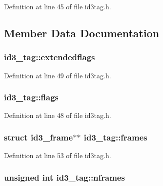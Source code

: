 Definition at line 45 of file id3tag.\+h.



\subsection{Member Data Documentation}
\subsubsection[{\texorpdfstring{extendedflags}{extendedflags}}]{ id3\+\_\+tag\+::extendedflags}\hypertarget{structid3__tag_a163849909cfa3cbe990075b345448789}{}\label{structid3__tag_a163849909cfa3cbe990075b345448789}


Definition at line 49 of file id3tag.\+h.

\subsubsection[{\texorpdfstring{flags}{flags}}]{ id3\+\_\+tag\+::flags}\hypertarget{structid3__tag_aa59f252be53abc68604a94b3891ecae7}{}\label{structid3__tag_aa59f252be53abc68604a94b3891ecae7}


Definition at line 48 of file id3tag.\+h.

\subsubsection[{\texorpdfstring{frames}{frames}}]{\setlength{\rightskip}{0pt plus 5cm}struct {\bf id3\+\_\+frame}$\ast$$\ast$ id3\+\_\+tag\+::frames}\hypertarget{structid3__tag_afce1159c8d3da137ffaee2744acc4049}{}\label{structid3__tag_afce1159c8d3da137ffaee2744acc4049}


Definition at line 53 of file id3tag.\+h.

\subsubsection[{\texorpdfstring{nframes}{nframes}}]{\setlength{\rightskip}{0pt plus 5cm}unsigned {\bf int} id3\+\_\+tag\+::nframes}\hypertarget{structid3__tag_a5f09491a7f0ef26ddcbe17cd5cfbf0f4}{}\label{structid3__tag_a5f09491a7f0ef26ddcbe17cd5cfbf0f4}


